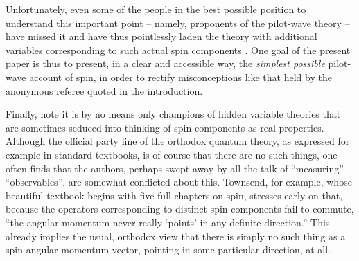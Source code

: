 \documentclass[aps,prc,onecolumn,letterpaper,floatfix,12pt]{revtex4}
\begin{document}
Unfortunately, even some of the people in the best possible position
to understand this important point -- namely, proponents of the
pilot-wave theory -- have missed it and have thus pointlessly laden the
theory with additional variables
corresponding to such actual spin components \cite{holland}.    One
goal of the present paper is thus to present, in a clear and
accessible way, the \emph{simplest possible} pilot-wave account of spin, in
order to rectify misconceptions like that held by the anonymous
referee quoted in the introduction.  

Finally, note it is by no means only
champions of hidden variable theories that are sometimes seduced into
thinking of spin components as real properties.
Although the official party line of the orthodox quantum theory, as
expressed for example in standard textbooks, is of course that there
are no such things, one often finds that the authors, perhaps swept
away by all the talk of ``measuring'' ``observables'', are somewhat
conflicted about this.  Townsend, for example, whose beautiful
textbook begins with five full chapters on spin, stresses early on
that, because the operators corresponding to distinct spin components
fail to commute, ``the angular momentum never really `points' in any
definite direction.''  \cite{townsend}  This already implies the
usual, orthodox view that there is simply no such thing as a spin angular
momentum vector, pointing in some particular direction, at all.  
\end{document}
